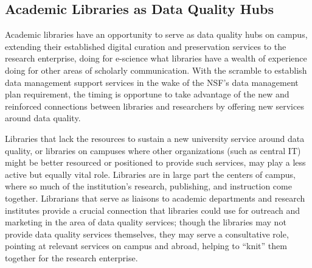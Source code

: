 \documentclass{acm_proc_article-sp}
\begin{document}
\subsection{Academic Libraries as Data Quality Hubs}

Academic libraries have an opportunity to serve as data quality hubs
on campus, extending their established digital curation and
preservation services to the research enterprise, doing for e-science
what libraries have a wealth of experience doing for other areas of
scholarly communication. With the scramble to establish data
management support services in the wake of the NSF's data management
plan requirement, the timing is opportune to take advantage of the new
and reinforced connections between libraries and researchers by
offering new services around data quality.

%

Libraries that lack the resources to sustain a new university service
around data quality, or libraries on campuses where other
organizations (such as central IT) might be better resourced or
positioned to provide such services, may play a less active but
equally vital role. Libraries are in large part the centers of campus,
where so much of the institution's research, publishing, and
instruction come together. Librarians that serve as liaisons to
academic departments and research institutes provide a crucial
connection that libraries could use for outreach and marketing in the
area of data quality services; though the libraries may not provide
data quality services themselves, they may serve a consultative role,
pointing at relevant services on campus and abroad, helping to
``knit'' them together for the research enterprise.
\end{document}
